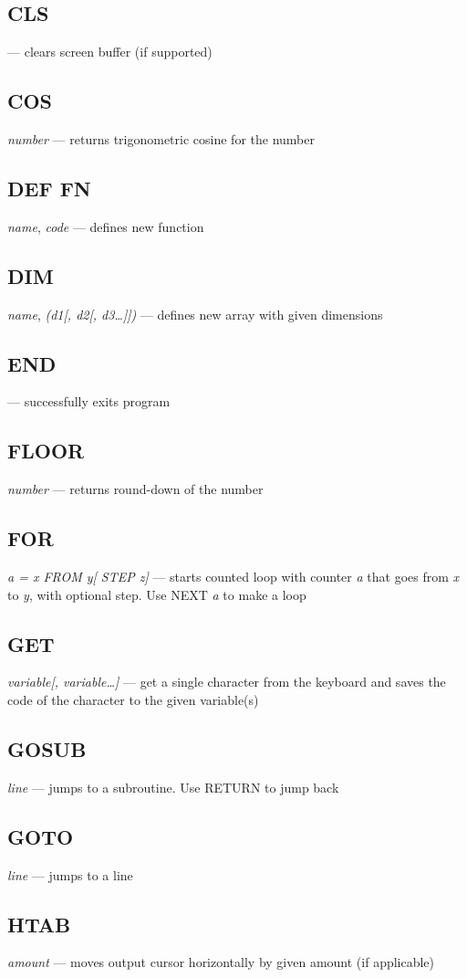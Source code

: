 \subsection{CLS} --- clears screen buffer (if supported)
\subsection{COS} \emph{number} --- returns trigonometric cosine for the number
\subsection{DEF FN} \emph{name}, \emph{code} --- defines new function
\subsection{DIM} \emph{name}, \emph{(d1[, d2[, d3\ldots]])} --- defines new array with given dimensions
\subsection{END} --- successfully exits program
\subsection{FLOOR} \emph{number} --- returns round-down of the number
\subsection{FOR} \emph{a = x FROM y[ STEP z]} --- starts counted loop with counter \emph{a} that goes from \emph{x} to \emph{y}, with optional step. Use NEXT \emph{a} to make a loop
\subsection{GET} \emph{variable[, variable\ldots]} --- get a single character from the keyboard and saves the code of the character to the given variable(s)
\subsection{GOSUB} \emph{line} --- jumps to a subroutine. Use RETURN to jump back
\subsection{GOTO} \emph{line} --- jumps to a line
\subsection{HTAB} \emph{amount} --- moves output cursor horizontally by given amount (if applicable)
